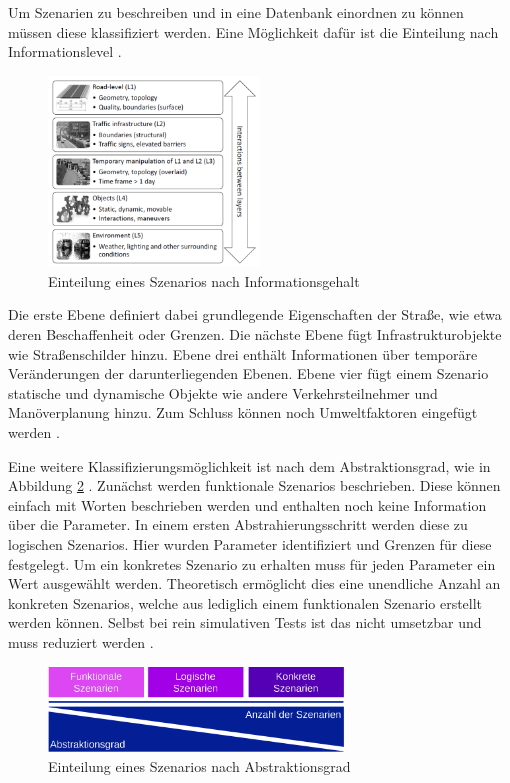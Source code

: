Um Szenarien zu beschreiben und in eine Datenbank einordnen zu können müssen diese klassifiziert werden. Eine Möglichkeit dafür ist die Einteilung nach Informationslevel \cite{Nalic2020}\cite{Bagschik2018}.
\begin{figure}[H]
    \centering
    \includegraphics[width=0.5\textwidth]{figures/2_Grundlagen/layer_model.png}
    \caption{Einteilung eines Szenarios nach Informationsgehalt \cite{Bagschik2018}}
    \label{fig:layer_model}
\end{figure}
Die erste Ebene definiert dabei grundlegende Eigenschaften der Straße, wie etwa deren Beschaffenheit oder Grenzen. Die nächste Ebene fügt Infrastrukturobjekte wie Straßenschilder hinzu. Ebene drei enthält Informationen über temporäre Veränderungen der darunterliegenden Ebenen. Ebene vier fügt einem Szenario statische und dynamische Objekte wie andere Verkehrsteilnehmer und Manöverplanung hinzu. Zum Schluss können noch Umweltfaktoren eingefügt werden \cite{Bagschik2018}.

Eine weitere Klassifizierungsmöglichkeit ist nach dem Abstraktionsgrad, wie in Abbildung \ref{fig:scenario_level} \cite{Nalic2020}\cite{menzel2018scenarios}. Zunächst werden funktionale Szenarios beschrieben. Diese können einfach mit Worten beschrieben werden und enthalten noch keine Information über die Parameter. In einem ersten Abstrahierungsschritt werden diese zu logischen Szenarios. Hier wurden Parameter identifiziert und Grenzen für diese festgelegt. Um ein konkretes Szenario zu erhalten muss für jeden Parameter ein Wert ausgewählt werden. Theoretisch ermöglicht dies eine unendliche Anzahl an konkreten Szenarios, welche aus lediglich einem funktionalen Szenario erstellt werden können. Selbst bei rein simulativen Tests ist das nicht umsetzbar und muss reduziert werden \cite{menzel2018scenarios}.
\begin{figure}
    \centering
    \includegraphics[width=0.7\textwidth]{figures/2_Grundlagen/scenario_level.pdf}
    \caption{Einteilung eines Szenarios nach Abstraktionsgrad \cite{menzel2018scenarios}}
    \label{fig:scenario_level}
\end{figure}

